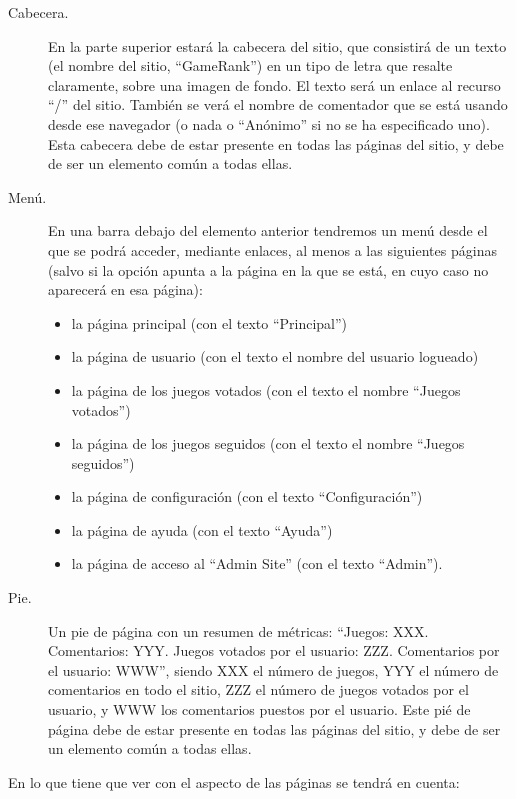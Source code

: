 \begin{description}
\item[Cabecera.] En la parte superior estará la cabecera del sitio, que consistirá de un texto (el nombre del sitio, ``GameRank'') en un tipo de letra que resalte claramente, sobre una imagen de fondo. El texto será un enlace al recurso ``/'' del sitio. También se verá el nombre de comentador que se está usando desde ese navegador (o nada o ``Anónimo'' si no se ha especificado uno). Esta cabecera debe de estar presente en todas las páginas del sitio, y debe de ser un elemento común a todas ellas.

\item[Menú.] En una barra debajo del elemento anterior tendremos un menú desde el que se podrá acceder, mediante enlaces, al menos a las siguientes páginas (salvo si la opción apunta a la página en la que se está, en cuyo caso no aparecerá en esa página):
  \begin{itemize}
  \item la página principal (con el texto ``Principal'')
  \item la página de usuario (con el texto el nombre del usuario logueado)
  \item la página de los juegos votados (con el texto el nombre ``Juegos votados'')
  \item la página de los juegos seguidos (con el texto el nombre ``Juegos seguidos'')
  \item la página de configuración (con el texto ``Configuración'')
  \item la página de ayuda (con el texto ``Ayuda'')
  \item la página de acceso al ``Admin Site'' (con el texto ``Admin''). 
  \end{itemize}

\item[Pie.] Un pie de página con un resumen de métricas: ``Juegos: XXX. Comentarios: YYY. Juegos votados por el usuario: ZZZ. Comentarios por el usuario: WWW'', siendo XXX el número de juegos, YYY el número de comentarios en todo el sitio, ZZZ el número de juegos votados por el usuario, y WWW los comentarios puestos por el usuario. Este pié de página debe de estar presente en todas las páginas del sitio, y debe de ser un elemento común a todas ellas.
\end{description}
  
En lo que tiene que ver con el aspecto de las páginas se tendrá en cuenta:

